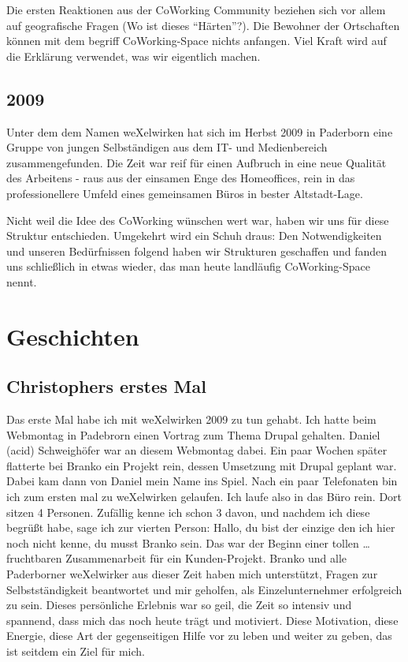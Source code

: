 \begin{appendix}
Die ersten Reaktionen aus der CoWorking Community beziehen sich vor allem auf geografische Fragen (Wo ist dieses "`Härten"'?). Die Bewohner der Ortschaften können mit dem begriff CoWorking-Space nichts anfangen. Viel Kraft wird auf die Erklärung verwendet, was wir eigentlich machen.
  \section{2009}
Unter dem dem Namen weXelwirken hat sich im Herbst 2009 in Paderborn eine Gruppe von jungen Selbständigen aus dem IT- und Medienbereich zusammengefunden. Die Zeit war reif für einen Aufbruch in eine neue Qualität des Arbeitens - raus aus der einsamen Enge des Homeoffices, rein in das professionellere Umfeld eines gemeinsamen Büros in bester Altstadt-Lage.

Nicht weil die Idee des CoWorking wünschen wert war, haben wir uns für diese Struktur entschieden. Umgekehrt wird ein Schuh draus: Den Notwendigkeiten und unseren Bedürfnissen folgend haben wir Strukturen geschaffen und fanden uns schließlich in etwas wieder, das man heute landläufig CoWorking-Space nennt.

\chapter{Geschichten}
  \section{Christophers erstes Mal}
Das erste Mal habe ich mit weXelwirken 2009 zu tun gehabt. Ich hatte beim Webmontag in Padebrorn einen Vortrag zum Thema Drupal gehalten. Daniel (acid) Schweighöfer war an diesem Webmontag dabei. Ein paar Wochen später flatterte bei Branko ein Projekt rein, dessen Umsetzung mit Drupal geplant war. Dabei kam dann von Daniel mein Name ins Spiel. Nach ein paar Telefonaten bin ich zum ersten mal zu weXelwirken gelaufen. Ich laufe also in das Büro rein. Dort sitzen 4 Personen. Zufällig kenne ich schon 3 davon, und nachdem ich diese begrüßt habe, sage ich zur vierten Person: Hallo, du bist der einzige den ich hier noch nicht kenne, du musst Branko sein. Das war der Beginn einer tollen \dots{} fruchtbaren Zusammenarbeit für ein Kunden-Projekt. 
Branko und alle Paderborner weXelwirker aus dieser Zeit haben mich unterstützt, Fragen zur Selbstständigkeit beantwortet und mir geholfen, als Einzelunternehmer erfolgreich zu sein. Dieses persönliche Erlebnis war so geil, die Zeit so intensiv und spannend, dass mich das noch heute trägt und motiviert. 
Diese Motivation, diese Energie, diese Art der gegenseitigen Hilfe vor zu leben und weiter zu geben, das ist seitdem ein Ziel für mich.


\end{appendix}
